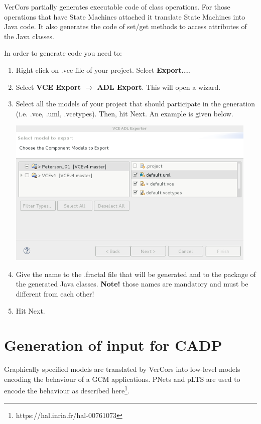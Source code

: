 \documentclass[12pt]{article}
\begin{document}
VerCors partially generates executable code of class operations. For those operations that have State Machines attached it translate State Machines into Java code. It also generates the code of set/get methods to access attributes of the Java classes.

In order to generate code you need to:
\begin{enumerate}
\item
Right-click on .vce file of your project. Select \textbf{Export...}. 
\item
Select \textbf{VCE Export $\rightarrow$ ADL Export}. This will open a wizard.
\item
Select all the models of your project that should participate in the generation (i.e. .vce, .uml, .vcetypes). Then, hit Next. An example is given below.

     \centerline{
     \includegraphics[width=12cm]{draws/code-gen.png}
     \label{fig:vce-proj}
     }
     
\item
Give the name to the .fractal file that will be generated and to the package of the generated Java classes. \textbf{Note! } those names are mandatory and must be different from each other!
\item
Hit Next. 

\end{enumerate}

\section{Generation of input for CADP}

Graphically specified models are translated by VerCors into low-level models encoding the behaviour of a GCM applications. PNets and pLTS are used to encode the behaviour as described here\footnote{https://hal.inria.fr/hal-00761073}.
\end{document}
